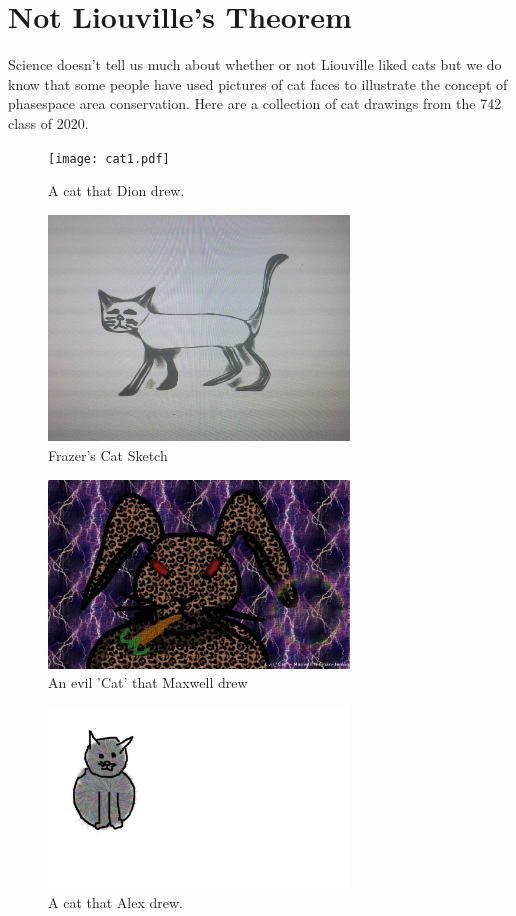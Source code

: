 \section{Not Liouville's Theorem}
Science doesn't tell us much about whether or not Liouville liked cats but we do know that some people have used pictures of cat faces to illustrate the concept of phasespace area conservation. 
Here are a collection of cat drawings from the 742 class of 2020.

\begin{centering}
\begin{figure}
	\texttt{[image: cat1.pdf]}
  \caption{A cat that Dion drew.}
  \label{fig:cat1}
\end{figure}

\begin{figure}
	\includegraphics[width=8cm]{catsketch.pdf}
  \caption{Frazer's Cat Sketch}
  \label{fig:catsketch}
\end{figure}

\begin{figure}
	\includegraphics[width=8cm]{catto.pdf}
  \caption{An evil 'Cat' that Maxwell drew}
  \label{fig:catto}
\end{figure}
\end{centering}

\begin{centering}
\begin{figure}
	\includegraphics[width=8cm]{cat742afer228.pdf}
  \caption{A cat that Alex drew.}
  \label{fig:cat742afer228}
\end{figure}
\end{centering}



\clearpage
